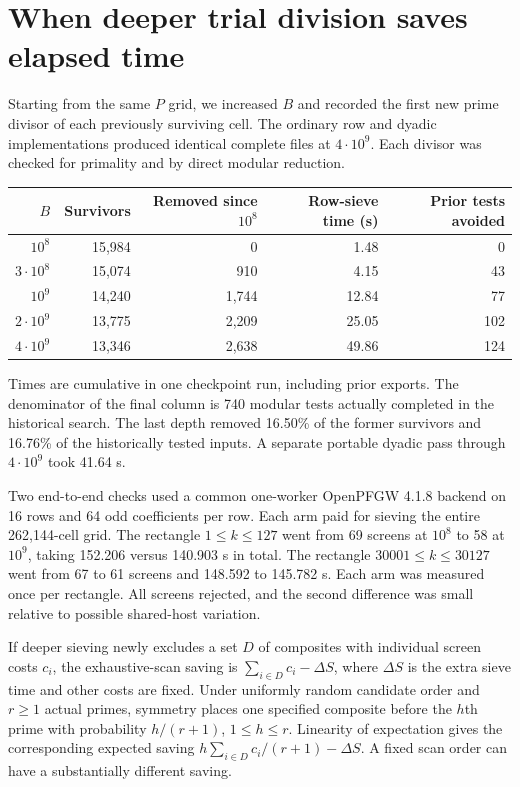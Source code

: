 \documentclass[11pt,a4paper,oneside,openany]{report}
\begin{document}
\section{When deeper trial division saves elapsed time}
Starting from the same $P$ grid, we increased $B$ and recorded the first new prime divisor of each previously surviving cell. The ordinary row and dyadic implementations produced identical complete files at $4\cdot10^9$. Each divisor was checked for primality and by direct modular reduction.
\begin{center}\small
\begin{tabular}{@{}rrrrr@{}}\toprule
$B$ & Survivors & Removed since $10^8$ & Row-sieve time (s) & Prior tests avoided\\\midrule
$10^8$ &15,984&0&1.48&0\\
$3\cdot10^8$ &15,074&910&4.15&43\\
$10^9$ &14,240&1,744&12.84&77\\
$2\cdot10^9$ &13,775&2,209&25.05&102\\
$4\cdot10^9$ &13,346&2,638&49.86&124\\\bottomrule
\end{tabular}
\end{center}
Times are cumulative in one checkpoint run, including prior exports. The denominator of the final column is 740 modular tests actually completed in the historical search. The last depth removed 16.50\% of the former survivors and 16.76\% of the historically tested inputs. A separate portable dyadic pass through $4\cdot10^9$ took 41.64 s.

Two end-to-end checks used a common one-worker OpenPFGW 4.1.8 backend on 16 rows and 64 odd coefficients per row. Each arm paid for sieving the entire 262,144-cell grid. The rectangle $1\le k\le127$ went from 69 screens at $10^8$ to 58 at $10^9$, taking 152.206 versus 140.903 s in total. The rectangle $30001\le k\le30127$ went from 67 to 61 screens and 148.592 to 145.782 s. Each arm was measured once per rectangle. All screens rejected, and the second difference was small relative to possible shared-host variation.

If deeper sieving newly excludes a set $D$ of composites with individual screen costs $c_i$, the exhaustive-scan saving is $\sum_{i\in D} c_i-\Delta S$, where $\Delta S$ is the extra sieve time and other costs are fixed. Under uniformly random candidate order and $r\ge1$ actual primes, symmetry places one specified composite before the $h$th prime with probability $h/(r+1)$, $1\le h\le r$. Linearity of expectation gives the corresponding expected saving $h\sum_{i\in D}c_i/(r+1)-\Delta S$. A fixed scan order can have a substantially different saving.
\end{document}

